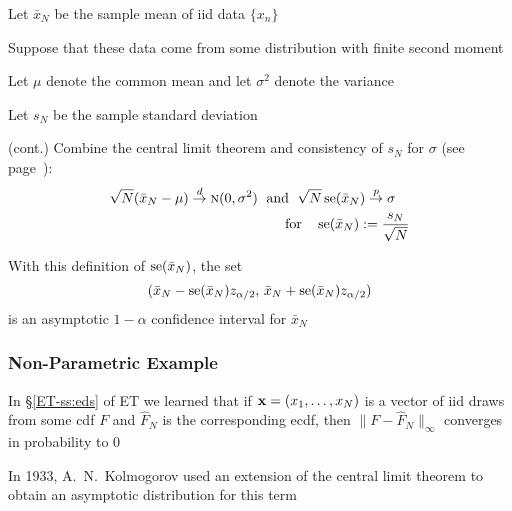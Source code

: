 \begin{frame}
    
    \vspace{2em}
    \Eg
    Let $\bar x_N$ be the sample mean of {\sc iid} data $\{x_n\}$
    
    Suppose that these data come from some distribution with finite second
    moment
    
    Let $\mu$ denote the common mean and let $\sigma^2$ denote the
    variance
    
    Let $s_N$ be the sample standard deviation
\end{frame}

\begin{frame}

    \vspace{2em}
    \Eg (cont.)
    Combine the
    central limit theorem and consistency of $s_N$ for $\sigma$ (see
    page~\pageref{ET-eg:ssdc}):
    \begin{align*}
        \label{eq:smnse}
        \sqrt{N}(\bar x_N - \mu) \stackrel { d } {\to} \textrm{\sc n}(0, \sigma^2)
        \;  \text{ and } \;
        \sqrt{N}\operatorname{se}(\bar x_N) \stackrel { p } {\to} \sigma
        \quad  \\ \text{for} \quad
        \operatorname{se}(\bar x_N) := \frac{s_N}{\sqrt{N}}
    \end{align*}
    
    \vspace{.7em}
    With this definition of $\operatorname{se}(\bar x_N)$,
    the set
    \begin{equation*}
        (\bar x_N - \operatorname{se}(\bar x_N) z_{\alpha/2}, 
            \, \bar x_N + \operatorname{se}(\bar x_N) z_{\alpha/2})
    \end{equation*}
    is an asymptotic $1-\alpha$ confidence interval for $\bar x_N$
\end{frame}

\begin{frame}\frametitle{Non-Parametric Example}
    
    \vspace{2em}
    In \S\ref{ET-ss:eds} of ET we learned that if ${\mathbf x} = (x_1, \ldots, x_N)$ is a vector
    of {\sc iid} draws from some {\sc cdf} $F$ and $\hat F_N$ is the corresponding
    {\sc ecdf},  then $ \| F - \hat F_N \|_{\infty}$ converges in probability to
    $0$
    
    \vspace{.7em}
    In 1933, A.\ N.\ Kolmogorov used an extension of the central limit theorem
    to obtain an asymptotic distribution for this term
    

\end{frame}

